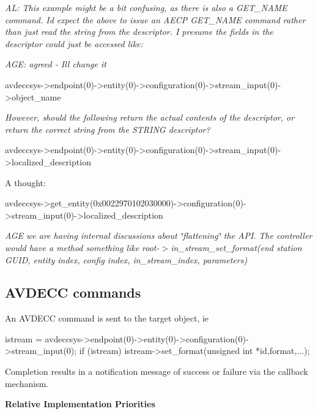 {\itshape AL\+: This example might be a bit confusing, as there is also a G\+E\+T\+\_\+\+N\+A\+ME command. I\textquotesingle{}d expect the above to issue an A\+E\+CP G\+E\+T\+\_\+\+N\+A\+ME command rather than just read the string from the descriptor. I presume the fields in the descriptor could just be accessed like\+:}

{\itshape A\+GE\+: agreed -\/ I\textquotesingle{}ll change it} \begin{DoxyVerb}avdeccsys->endpoint(0)->entity(0)->configuration(0)->stream_input(0)->object_name
\end{DoxyVerb}


{\itshape However, should the following return the actual contents of the descriptor, or return the correct string from the S\+T\+R\+I\+NG descriptor?} \begin{DoxyVerb}avdeccsys->endpoint(0)->entity(0)->configuration(0)->stream_input(0)->localized_description
\end{DoxyVerb}


A thought\+: \begin{DoxyVerb}avdeccsys->get_entity(0x0022970102030000)->configuration(0)->stream_input(0)->localized_description
\end{DoxyVerb}


{\itshape A\+GE we are having internal discussions about \char`\"{}flattening\char`\"{} the A\+PI.} {\itshape The controller would have a method something like} {\itshape root-\/$>$in\+\_\+stream\+\_\+set\+\_\+format(end station G\+U\+I\+D, entity index, config index, in\+\_\+stream\+\_\+index, parameters)}

\subsection*{A\+V\+D\+E\+CC commands }

An A\+V\+D\+E\+CC command is sent to the target object, ie \begin{DoxyVerb}istream = avdeccsys->endpoint(0)->entity(0)->configuration(0)->stream_input(0);
if (istream) {
    istream->set_format(unsigned int *id,format,...);
}
\end{DoxyVerb}


Completion results in a notification message of success or failure via the callback mechanism.

{\bfseries Relative Implementation Priorities}

